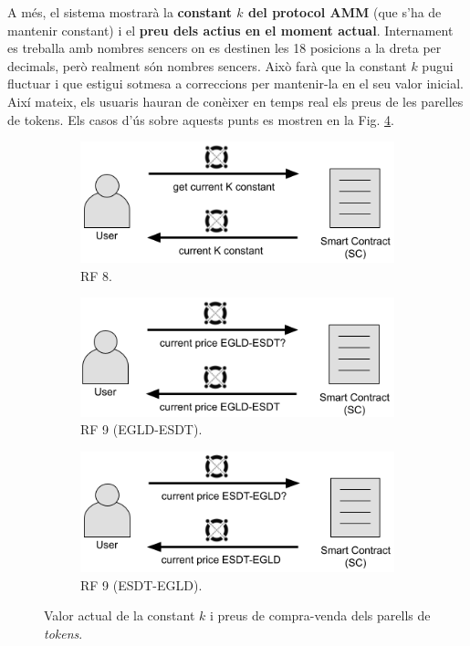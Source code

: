 \documentclass[11pt,a4paper]{article}
\begin{document}
A més, el sistema mostrarà la \textbf{constant \(k\) del protocol AMM} (que s'ha de mantenir constant) i el \textbf{preu dels actius en el moment actual}. Internament es treballa amb nombres sencers on es destinen les 18 posicions a la dreta per decimals, però realment són nombres sencers. Això farà que la constant \(k\) pugui fluctuar i que estigui sotmesa a correccions per mantenir-la en el seu valor inicial. Així mateix, els usuaris hauran de conèixer en temps real els preus de les parelles de tokens. Els casos d'ús sobre aquests punts es mostren en la Fig. \ref{fig:RRFF8-9}.

\begin{figure}[!htb]
\begin{subfigure}[b]{0.33\textwidth}
  \includegraphics[width=\linewidth]{cu_k_constant.png}
  \caption{RF 8.}\label{fig:kconstant}
\end{subfigure}\hfill
\begin{subfigure}[b]{0.33\textwidth}
  \includegraphics[width=\linewidth]{cu_current_price_EGLD_ESDT.png}
  \caption{RF 9 (EGLD-ESDT).}\label{fig:price_egld_esdt}
\end{subfigure}\hfill
\begin{subfigure}[b]{0.33\textwidth}
  \includegraphics[width=\linewidth]{cu_current_price_ESDT_EGLD.png}
  \caption{RF 9 (ESDT-EGLD).}\label{fig:price_esdt_egld}
\end{subfigure}\hfill
\caption{Valor actual de la constant \(k\) i preus de compra-venda dels parells de \textit{tokens}.}
\label{fig:RRFF8-9}
\end{figure}
\end{document}
